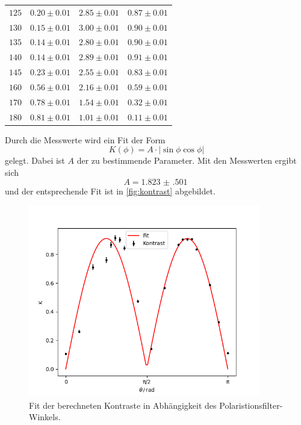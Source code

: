 \begin{table}
\begin{tabular}{c c c c}
        $125$ &   $ 0.20\pm 0.01$ & $  	2.85 \pm 0.01$ &  $ 0.87 \pm 0.01 $ \\
        $130$ &   $ 0.15\pm 0.01$ & $  	3.00 \pm 0.01$ &  $ 0.90 \pm 0.01 $ \\
        $135$ &   $ 0.14\pm 0.01$ & $  	2.80 \pm 0.01$ &  $ 0.90 \pm 0.01 $ \\
        $140$ &   $ 0.14\pm 0.01$ & $  	2.89 \pm 0.01$ &  $ 0.91 \pm 0.01 $ \\
        $145$ &   $ 0.23\pm 0.01$ & $  	2.55 \pm 0.01$ &  $ 0.83 \pm 0.01 $ \\
        $160$ &   $ 0.56\pm 0.01$ & $  	2.16 \pm 0.01$ &  $ 0.59 \pm 0.01 $ \\
        $170$ &   $ 0.78\pm 0.01$ & $  	1.54 \pm 0.01$ &  $ 0.32 \pm 0.01 $ \\
        $180$ &   $ 0.81\pm 0.01$ & $  	1.01 \pm 0.01$ &  $ 0.11 \pm 0.01 $ \\
        \bottomrule
    \end{tabular}
\end{table}
Durch die Messwerte wird ein Fit der Form 
\begin{equation*}
    K(\phi) = A \cdot |\sin{\phi}\cos{\phi}|
\end{equation*}
gelegt.
Dabei ist $A$ der zu bestimmende Parameter.
Mit den Messwerten ergibt sich 
\begin{equation*}
    A = \qty{1.823(501)}{}
\end{equation*}
und der entsprechende Fit ist in \autoref{fig:kontrast} abgebildet.
\begin{figure}
    \centering
    \includegraphics[width=0.9\textwidth]{python/kontrast.png}
    \caption{Fit der berechneten Kontraste in Abhängigkeit des Polaristionsfilter-Winkels.}
    \label{fig:kontrast}
\end{figure}


